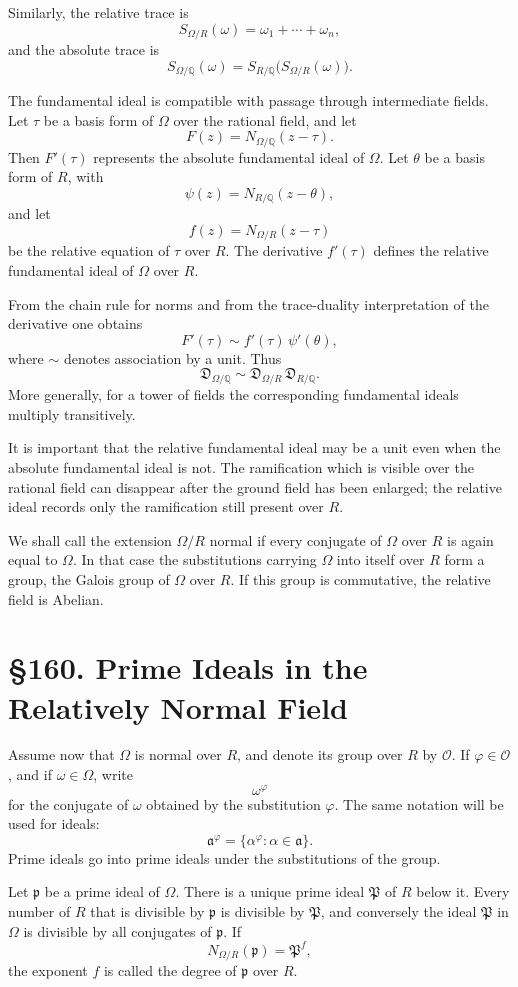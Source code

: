 \documentclass[12pt,a4paper]{article}
\newcommand{\webersection}[2]{\clearpage\section*{\S #1. #2}}
\newcommand{\Pgr}{\mathfrak P}
\newcommand{\D}{\mathfrak D}
\newcommand{\p}{\mathfrak p}
\newcommand{\aideal}{\mathfrak a}
\begin{document}
Similarly, the relative trace is
\[
  S_{\Omega/R}(\omega)=\omega_1+\cdots+\omega_n,
\tag{3}
\]
and the absolute trace is
\[
  S_{\Omega/\mathbb Q}(\omega)
      =S_{R/\mathbb Q}\bigl(S_{\Omega/R}(\omega)\bigr).
\tag{4}
\]

The fundamental ideal is compatible with passage through intermediate fields.  Let \(\tau\) be a basis form of \(\Omega\) over the rational field, and let
\[
  F(z)=N_{\Omega/\mathbb Q}(z-\tau).
\]
Then \(F'(\tau)\) represents the absolute fundamental ideal of \(\Omega\).  Let \(\theta\) be a basis form of \(R\), with
\[
  \psi(z)=N_{R/\mathbb Q}(z-\theta),
\]
and let
\[
  f(z)=N_{\Omega/R}(z-\tau)
\]
be the relative equation of \(\tau\) over \(R\).  The derivative \(f'(\tau)\) defines the relative fundamental ideal of \(\Omega\) over \(R\).

From the chain rule for norms and from the trace-duality interpretation of the derivative one obtains
\[
  F'(\tau)\sim f'(\tau)\,\psi'(\theta),
\tag{5}
\]
where \(\sim\) denotes association by a unit.  Thus
\[
  \D_{\Omega/\mathbb Q}
     \sim \D_{\Omega/R}\,\D_{R/\mathbb Q}.
\tag{6}
\]
More generally, for a tower of fields the corresponding fundamental ideals multiply transitively.

It is important that the relative fundamental ideal may be a unit even when the absolute fundamental ideal is not.  The ramification which is visible over the rational field can disappear after the ground field has been enlarged; the relative ideal records only the ramification still present over \(R\).

We shall call the extension \(\Omega/R\) normal if every conjugate of \(\Omega\) over \(R\) is again equal to \(\Omega\).  In that case the substitutions carrying \(\Omega\) into itself over \(R\) form a group, the Galois group of \(\Omega\) over \(R\).  If this group is commutative, the relative field is Abelian.

\webersection{160}{Prime Ideals in the Relatively Normal Field}

Assume now that \(\Omega\) is normal over \(R\), and denote its group over \(R\) by \(\mathcal O\).  If \(\varphi\in\mathcal O\), and if \(\omega\in\Omega\), write
\[
  \omega^\varphi
\]
for the conjugate of \(\omega\) obtained by the substitution \(\varphi\).  The same notation will be used for ideals:
\[
  \aideal^\varphi=\{\alpha^\varphi:\alpha\in\aideal\}.
\]
Prime ideals go into prime ideals under the substitutions of the group.

Let \(\p\) be a prime ideal of \(\Omega\).  There is a unique prime ideal \(\Pgr\) of \(R\) below it.  Every number of \(R\) that is divisible by \(\p\) is divisible by \(\Pgr\), and conversely the ideal \(\Pgr\) in \(\Omega\) is divisible by all conjugates of \(\p\).  If
\[
  N_{\Omega/R}(\p)=\Pgr^f,
\tag{1}
\]
the exponent \(f\) is called the degree of \(\p\) over \(R\).
\end{document}
